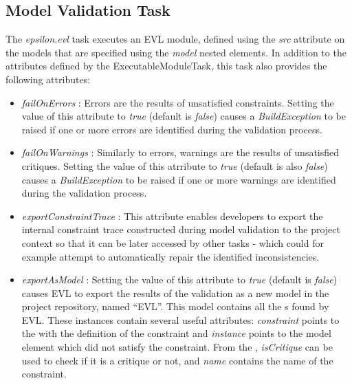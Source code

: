 \subsection{Model Validation Task}
\label{sec:EvlTask}

The \emph{epsilon.evl} task executes an EVL module, defined using the \emph{src} attribute on the models that are specified using the \emph{model} nested elements. In addition to the attributes defined by the ExecutableModuleTask, this task also provides the following attributes:

\begin{itemize}
	\item \emph{failOnErrors} : Errors are the results of unsatisfied constraints. Setting the value of this attribute to \emph{true} (default is \emph{false}) causes a \emph{BuildException} to be raised if one or more errors are identified during the validation process.
	\item \emph{failOnWarnings} : Similarly to errors, warnings are the results of unsatisfied critiques. Setting the value of this atrribute to \emph{true} (default is also \emph{false}) causes a \emph{BuildException} to be raised if one or more warnings are identified during the validation process.
	\item \emph{exportConstraintTrace} : This attribute enables developers to export the internal constraint trace constructed during model validation to the project context so that it can be later accessed by other tasks - which could for example attempt to automatically repair the identified inconsistencies.
        \item \emph{exportAsModel} : Setting the value of this attribute to \emph{true} (default is \emph{false}) causes EVL to export the results of the validation as a new model in the project repository, named ``EVL''. This model contains all the s found by EVL. These instances contain several useful attributes: \emph{constraint} points to the  with the definition of the constraint and \emph{instance} points to the model element which did not satisfy the constraint. From the , \emph{isCritique} can be used to check if it is a critique or not, and \emph{name} contains the name of the constraint.
\end{itemize}
